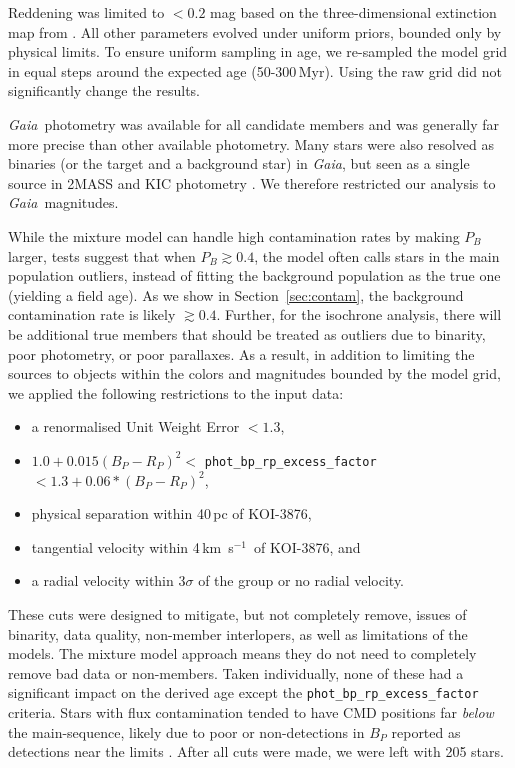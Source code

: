 \documentclass[twocolumn, linenumbers]{aastex631}
\newcommand{\starname}{KOI-3876}
\newcommand\kms{km~s$^{-1}$}
\newcommand{\gaia}{\textit{Gaia}}
\begin{document}
Reddening was limited to $<0.2$ mag based on the three-dimensional extinction map from \citet{2019ApJ...887...93G}. All other parameters evolved under uniform priors, bounded only by physical limits. To ensure uniform sampling in age, we re-sampled the model grid in equal steps around the expected age (50-300\,Myr). Using the raw grid did not significantly change the results. 

\gaia\ photometry was available for all candidate members and was generally far more precise than other available photometry. Many stars were also resolved as binaries (or the target and a background star) in \gaia, but seen as a single source in 2MASS and KIC photometry \citep{Brown2011}. We therefore restricted our analysis to \gaia\ magnitudes. 

While the mixture model can handle high contamination rates by making $P_B$ larger, tests suggest that when $P_B\gtrsim0.4$, the model often calls stars in the main population outliers, instead of fitting the background population as the true one (yielding a field age). As we show in Section~\ref{sec:contam}, the background contamination rate is likely $\gtrsim0.4$. Further, for the isochrone analysis, there will be additional true members that should be treated as outliers due to binarity, poor photometry, or poor parallaxes. As a result, in addition to limiting the sources to objects within the colors and magnitudes bounded by the model grid, we applied the following restrictions to the input data:
\begin{itemize}
    \item a renormalised Unit Weight Error \citep[RUWE; ][]{GaiaEDR3} $<1.3$,
    \item $1.0+0.015(B_P-R_P)^2<$ \texttt{phot\_bp\_rp\_excess\_factor} $< 1.3 + 0.06*(B_P-R_P)^2$,
    \item physical separation within 40\,pc of \starname,
    \item tangential velocity within 4\,\kms\ of \starname, and
    \item a radial velocity within $3\sigma$ of the group or no radial velocity.
    \end{itemize}

These cuts were designed to mitigate, but not completely remove, issues of binarity, data quality, non-member interlopers, as well as limitations of the models. The mixture model approach means they do not need to completely remove bad data or non-members. Taken individually, none of these had a significant impact on the derived age except the \texttt{phot\_bp\_rp\_excess\_factor} criteria. Stars with flux contamination tended to have CMD positions far {\it below} the main-sequence, likely due to poor or non-detections in $B_P$ reported as detections near the limits \citep{GaiaEDR3Validation}. After all cuts were made, we were left with 205 stars. 
\end{document}
